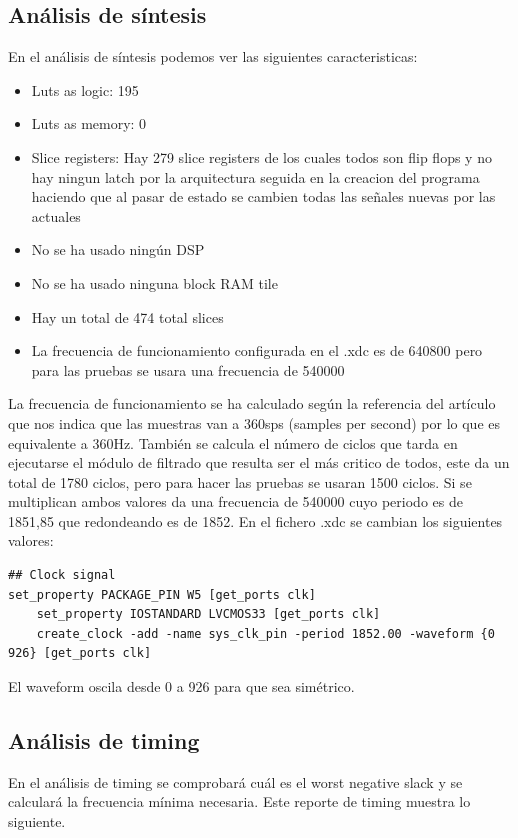 \FloatBarrier

\subsection{Análisis de síntesis}

	En el análisis de síntesis podemos ver las siguientes caracteristicas:

	\begin{itemize}
		\item Luts as logic: 195
		\item Luts as memory: 0
		\item Slice registers: Hay 279 slice registers de los cuales todos son flip flops y no hay ningun latch por la arquitectura 
		seguida en la creacion del programa haciendo que al pasar de estado se cambien todas las señales nuevas por las actuales
		\item No se ha usado ningún DSP
		\item No se ha usado ninguna block RAM tile
		\item Hay un total de 474 total slices
		\item La frecuencia de funcionamiento configurada en el .xdc es de 640800 pero para las pruebas se usara una frecuencia de 540000
	\end{itemize}

	La frecuencia de funcionamiento se ha calculado según la referencia del artículo \cite{desai2021low} que nos indica que las muestras van a 360sps (samples per second) 
	por lo que es equivalente a 360Hz. También se calcula el número de ciclos que tarda en ejecutarse el módulo de filtrado que resulta ser el más critico 
	de todos, este da un total de 1780 ciclos, pero para hacer las pruebas se usaran 1500 ciclos. Si se multiplican ambos valores da una frecuencia de 540000 
	cuyo periodo es de 1851,85 que redondeando es de 1852. En el fichero .xdc se cambian los siguientes valores:

\lstset{language=VHDL, breaklines=true, basicstyle=\footnotesize}
\begin{lstlisting}[frame=single]
## Clock signal
set_property PACKAGE_PIN W5 [get_ports clk]							
	set_property IOSTANDARD LVCMOS33 [get_ports clk]
	create_clock -add -name sys_clk_pin -period 1852.00 -waveform {0 926} [get_ports clk]
\end{lstlisting}

El waveform oscila desde 0 a 926 para que sea simétrico.

\subsection{Análisis de timing}
	En el análisis de timing se comprobará cuál es el worst negative slack y se calculará la frecuencia mínima necesaria. Este reporte de timing muestra lo siguiente.

